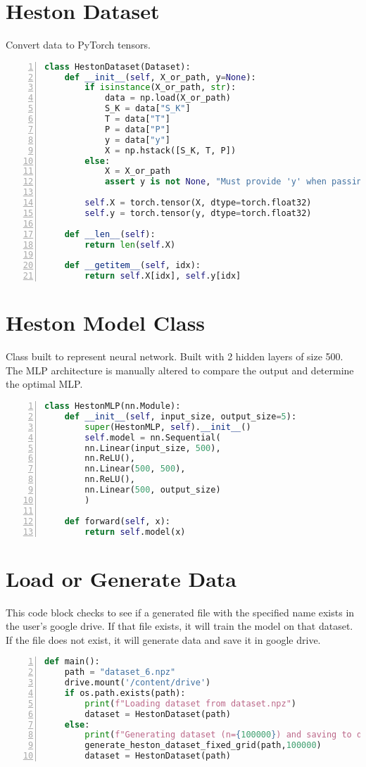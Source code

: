 \documentclass{article}
\begin{document}
\section{Heston Dataset}
Convert data to PyTorch tensors.
\lstset{firstnumber=last}
\begin{lstlisting}[language=Python, caption={Splits the generated Data}, label={lst:imports}, numbers=left]
class HestonDataset(Dataset):
    def __init__(self, X_or_path, y=None):
        if isinstance(X_or_path, str):
            data = np.load(X_or_path)
            S_K = data["S_K"]
            T = data["T"]
            P = data["P"]
            y = data["y"]
            X = np.hstack([S_K, T, P])
        else:
            X = X_or_path
            assert y is not None, "Must provide 'y' when passing arrays directly"

        self.X = torch.tensor(X, dtype=torch.float32)
        self.y = torch.tensor(y, dtype=torch.float32)

    def __len__(self):
        return len(self.X)

    def __getitem__(self, idx):
        return self.X[idx], self.y[idx]
\end{lstlisting}

\section{Heston Model Class}
Class built to represent neural network. Built with 2 hidden layers of size 500. The MLP architecture is manually altered to compare the output and determine the optimal MLP.
\lstset{firstnumber=last}
\begin{lstlisting}[language=Python, caption={Create Neural Network}, label={lst:imports}, numbers=left]
class HestonMLP(nn.Module):
    def __init__(self, input_size, output_size=5):
        super(HestonMLP, self).__init__()
        self.model = nn.Sequential(
        nn.Linear(input_size, 500),
        nn.ReLU(),
        nn.Linear(500, 500),
        nn.ReLU(),
        nn.Linear(500, output_size)
        )

    def forward(self, x):
        return self.model(x)
\end{lstlisting}

\section{Load or Generate Data}
This code block checks to see if a generated file with the specified name exists in the user's google drive. If that file exists, it will train the model on that dataset. If the file does not exist, it will generate data and save it in google drive.
\lstset{firstnumber=last}
\begin{lstlisting}[language=Python, caption={Loading or generating data}, label={lst:imports}, numbers=left]
def main():
    path = "dataset_6.npz"
    drive.mount('/content/drive')
    if os.path.exists(path):
        print(f"Loading dataset from dataset.npz")
        dataset = HestonDataset(path)
    else:
        print(f"Generating dataset (n={100000}) and saving to dataset.npz")
        generate_heston_dataset_fixed_grid(path,100000)
        dataset = HestonDataset(path)
\end{lstlisting}
\end{document}
